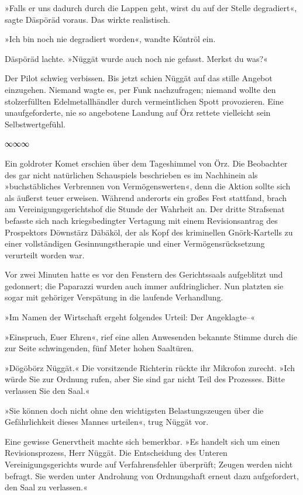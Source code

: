 »Falls er uns dadurch durch die Lappen geht, wirst du auf der Stelle degradiert«, sagte Däspöräd voraus. Das wirkte realistisch.

»Ich bin noch nie degradiert worden«, wandte Köntröl ein.

Däspöräd lachte. »Nüggät wurde auch noch nie gefasst. Merkst du was?«

Der Pilot schwieg verbissen. Bis jetzt schien Nüggät auf das stille Angebot einzugehen. Niemand wagte es, per Funk nachzufragen; niemand wollte den stolzerfüllten Edelmetallhändler durch vermeintlichen Spott provozieren. Eine unaufgeforderte, nie so angebotene Landung auf Örz rettete vielleicht sein Selbstwertgefühl.

\begin{center}
∞∞∞
\end{center}

Ein goldroter Komet erschien über dem Tageshimmel von Örz. Die Beobachter des gar nicht natürlichen Schauspiels beschrieben es im Nachhinein als »buchstäbliches Verbrennen von Vermögenswerten«, denn die Aktion sollte sich als äußerst teuer erweisen. Während anderorts ein großes Fest stattfand, brach am Vereinigungsgerichtshof die Stunde der Wahrheit an. Der dritte Strafsenat befasste sich nach kriegsbedingter Vertagung mit einem Revisionsantrag des Prospektors Döwnstärz Däbäköl, der als Kopf des kriminellen Gnörk-Kartells zu einer vollständigen Gesinnungstherapie und einer Vermögensrücksetzung verurteilt worden war.

Vor zwei Minuten hatte es vor den Fenstern des Gerichtssaals aufgeblitzt und gedonnert; die Paparazzi wurden auch immer aufdringlicher. Nun platzten sie sogar mit gehöriger Verspätung in die laufende Verhandlung.

»Im Namen der Wirtschaft ergeht folgendes Urteil: Der Angeklagte–«

»Einspruch, Euer Ehren«, rief eine allen Anwesenden bekannte Stimme durch die zur Seite schwingenden, fünf Meter hohen Saaltüren.

»Dögöbörz Nüggät.« Die vorsitzende Richterin rückte ihr Mikrofon zurecht. »Ich würde Sie zur Ordnung rufen, aber Sie sind gar nicht Teil des Prozesses. Bitte verlassen Sie den Saal.«

»Sie können doch nicht ohne den wichtigsten Belastungszeugen über die Gefährlichkeit dieses Mannes urteilen«, trug Nüggät vor.

Eine gewisse Genervtheit machte sich bemerkbar. »Es handelt sich um einen Revisionsprozess, Herr Nüggät. Die Entscheidung des Unteren Vereinigungsgerichts wurde auf Verfahrensfehler überprüft; Zeugen werden nicht befragt. Sie werden unter Androhung von Ordnungshaft erneut dazu aufgefordert, den Saal zu verlassen.«

